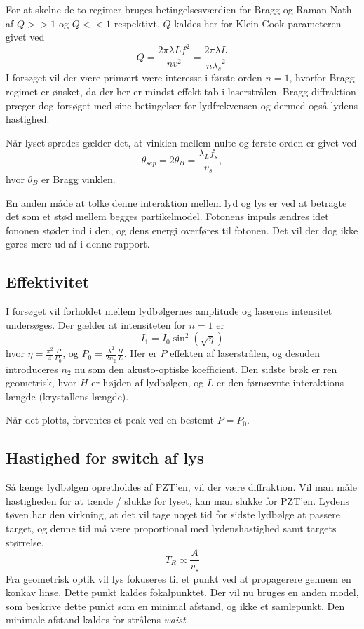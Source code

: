 \documentclass[main]{subfiles}
\begin{document}
For at skelne de to regimer bruges betingelsesværdien for Bragg og Raman-Nath af $Q>>1$ og $Q<<1$ respektivt. $Q$ kaldes her for Klein-Cook parameteren givet ved
\begin{equation}
    Q = \frac{2\pi\lambda L f^2}{nv^2}=\frac{2\pi\lambda L}{n{\lambda_s}^2}
\label{eq:KleinCook}
\end{equation}
I forsøget vil der være primært være interesse i første orden $n=1$, hvorfor Bragg-regimet er ønsket, da der her er mindst effekt-tab i laserstrålen. Bragg-diffraktion præger dog forsøget med sine betingelser for lydfrekvensen og dermed også lydens hastighed.

Når lyset spredes gælder det, at vinklen mellem nulte og første orden er givet ved
\begin{equation}
    \theta_{sep} = 2 \theta_B = \frac{\lambda_L f_s}{v_s},
    \label{eq:sep}
\end{equation}
hvor $\theta_B$ er Bragg vinklen.

En anden måde at tolke denne interaktion mellem lyd og lys er ved at betragte det som et stød mellem begges partikelmodel. Fotonens impuls ændres idet fononen støder ind i den, og dens energi overføres til fotonen. Det vil der dog ikke gøres mere ud af i denne rapport. 

\subsection{Effektivitet}
I forsøget vil forholdet mellem lydbølgernes amplitude og laserens intensitet undersøges. Der gælder at intensiteten for $n=1$ er
\begin{equation}
    I_1 = I_0 \sin^2\left( \sqrt{\eta} \right)
    \label{eq:Intensitet}
\end{equation}
hvor $\eta = \frac{\pi^2}{4}\frac{P}{P_0}$, og $P_0 = \frac{\lambda^2}{2 n_2}\frac{H}{L}$. Her er $P$ effekten af laserstrålen, og desuden introduceres $n_2$ nu som den akusto-optiske koefficient. Den sidste brøk er ren geometrisk, hvor $H$ er højden af lydbølgen, og $L$ er den førnævnte interaktions længde (krystallens længde).

Når det plotts, forventes et peak ved en bestemt $P=P_0$.

\subsection{Hastighed for switch af lys}
Så længe lydbølgen opretholdes af PZT'en, vil der være diffraktion. Vil man måle hastigheden for at tænde / slukke for lyset, kan man slukke for PZT'en. Lydens tøven har den virkning, at det vil tage noget tid for sidste lydbølge at passere target, og denne tid må være proportional med lydenshastighed samt targets størrelse.
\begin{equation}
    T_R \propto \frac{A}{v_s}
    \label{eq:risetime}
\end{equation}
Fra geometrisk optik vil lys fokuseres til et punkt ved at propagerere gennem en konkav linse. Dette punkt kaldes fokalpunktet.
Der vil nu bruges en anden model, som beskrive dette punkt som en minimal afstand, og ikke et samlepunkt. Den minimale afstand kaldes for strålens \emph{waist}.
\end{document}
